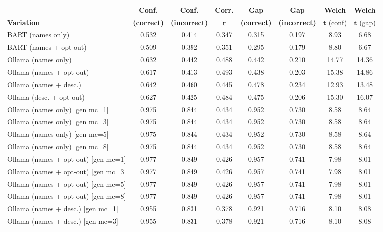 
\begin{tabular}{lccccccc}
\toprule
& \textbf{Conf.} & \textbf{Conf.} & \textbf{Corr.} & \textbf{Gap} & \textbf{Gap} & \textbf{Welch} & \textbf{Welch} \\
\textbf{Variation} & \textbf{(correct)} & \textbf{(incorrect)} & $\boldsymbol{r}$ & \textbf{(correct)} & \textbf{(incorrect)} & $\boldsymbol{t}$ (conf) & $\boldsymbol{t}$ (gap) \\
\midrule
BART (names only) & 0.532 & 0.414 & 0.347 & 0.315 & 0.197 & 8.93 & 6.68 \\
BART (names + opt-out) & 0.509 & 0.392 & 0.351 & 0.295 & 0.179 & 8.80 & 6.67 \\
\addlinespace
Ollama (names only) & 0.632 & 0.442 & 0.488 & 0.442 & 0.210 & 14.77 & 14.36 \\
Ollama (names + opt-out) & 0.617 & 0.413 & 0.493 & 0.438 & 0.203 & 15.38 & 14.86 \\
Ollama (names + desc.) & 0.642 & 0.460 & 0.445 & 0.478 & 0.234 & 12.93 & 13.48 \\
Ollama (desc. + opt-out) & 0.627 & 0.425 & 0.484 & 0.475 & 0.206 & 15.30 & 16.07 \\
Ollama (names only) [gen mc=1] & 0.975 & 0.844 & 0.434 & 0.952 & 0.730 & 8.58 & 8.64 \\
Ollama (names only) [gen mc=3] & 0.975 & 0.844 & 0.434 & 0.952 & 0.730 & 8.58 & 8.64 \\
Ollama (names only) [gen mc=5] & 0.975 & 0.844 & 0.434 & 0.952 & 0.730 & 8.58 & 8.64 \\
Ollama (names only) [gen mc=8] & 0.975 & 0.844 & 0.434 & 0.952 & 0.730 & 8.58 & 8.64 \\
Ollama (names + opt-out) [gen mc=1] & 0.977 & 0.849 & 0.426 & 0.957 & 0.741 & 7.98 & 8.01 \\
Ollama (names + opt-out) [gen mc=3] & 0.977 & 0.849 & 0.426 & 0.957 & 0.741 & 7.98 & 8.01 \\
Ollama (names + opt-out) [gen mc=5] & 0.977 & 0.849 & 0.426 & 0.957 & 0.741 & 7.98 & 8.01 \\
Ollama (names + opt-out) [gen mc=8] & 0.977 & 0.849 & 0.426 & 0.957 & 0.741 & 7.98 & 8.01 \\
Ollama (names + desc.) [gen mc=1] & 0.955 & 0.831 & 0.378 & 0.921 & 0.716 & 8.10 & 8.08 \\
Ollama (names + desc.) [gen mc=3] & 0.955 & 0.831 & 0.378 & 0.921 & 0.716 & 8.10 & 8.08 \\

\end{tabular}
